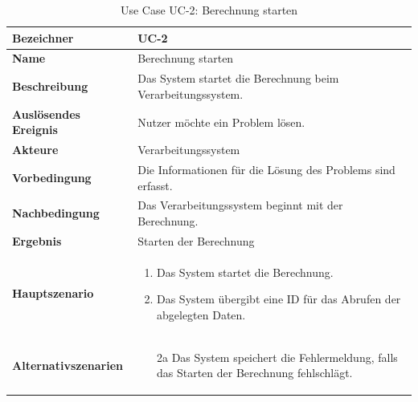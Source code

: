 \begin{table}[ht]
\centering
  \begin{tabular}{ l | p{10cm} }
	\hline
	\rowcolor{gray}
	\textbf{Bezeichner}	&	\textbf{UC-2}\\ \hline
	\textbf{Name}			&	Berechnung starten\\ \hline
	\textbf{Beschreibung}	&	Das System startet die Berechnung beim Verarbeitungssystem.\\ \hline
	\textbf{Auslösendes Ereignis} &	Nutzer möchte ein Problem lösen.\\ \hline
	\textbf{Akteure}		&	Verarbeitungssystem\\ \hline
	\textbf{Vorbedingung}	&	Die Informationen für die Lösung des Problems sind erfasst.\\ \hline
	\textbf{Nachbedingung}	&	Das Verarbeitungssystem beginnt mit der Berechnung.\\ \hline
	\textbf{Ergebnis}		&	Starten der Berechnung\\ \hline
	\textbf{Hauptszenario}	&	\begin{enumerate}
					\item Das System startet die Berechnung. 
					\item Das System übergibt eine ID für das Abrufen der abgelegten Daten.
					\end{enumerate}
					\\ \hline
	\textbf{Alternativszenarien}	&	\begin{enumerate}
					\item[2a] Das System speichert die Fehlermeldung, falls das Starten der Berechnung fehlschlägt.
					\end{enumerate}
					\\ \hline
  \end{tabular}
   \caption{Use Case UC-2: Berechnung starten}\label{table:use_case_2}
\end{table}

